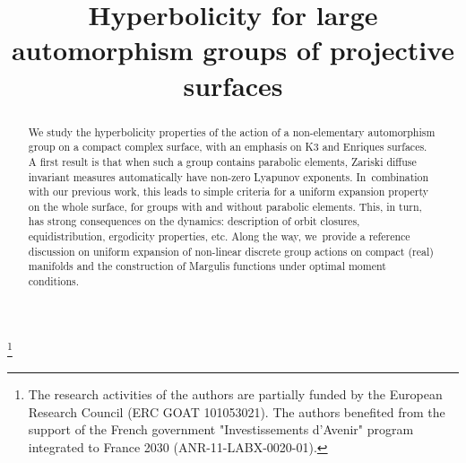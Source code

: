 \documentclass[JEP,XML,SOM,Unicode,published]{cedram}
\theoremstyle{plain}
\theoremstyle{definition}
\begin{document}
\frontmatter
\title[Hyperbolicity for automorphism groups of surfaces]
{Hyperbolicity for large automorphism groups of projective surfaces}

\author[\initial{S.} \lastname{Cantat}]{ }
\address{IRMAR, Campus de Beaulieu,\\
bât. 22-23, 263 avenue du Général Leclerc, CS 74205, 35042, Rennes Cedex}

\author[\initial{R.} \lastname{Dujardin}]{ }
\address{Sorbonne Université and Université Paris Cité, Laboratoire de Probabilités, Statistique et Modélisation (LPSM),\\
F-75005 Paris, France}

\thanks{The research activities of the authors are partially funded by the European Research Council (ERC GOAT 101053021). The authors benefited from the support of the French government "Investissements d'Avenir" program integrated to France 2030 (ANR-11-LABX-0020-01).}

\begin{abstract}
We study the hyperbolicity properties of the action of a non-elementary automorphism group on a compact complex surface, with an emphasis on K3 and Enriques surfaces. A first result is that when such a group contains parabolic elements, Zariski diffuse invariant measures automatically have non-zero Lyapunov exponents. In~combination with our previous work, this leads to simple criteria for a uniform expansion property on the whole surface, for groups with and without parabolic elements. This, in turn, has strong consequences on the dynamics: description of orbit closures, equidistribution, ergodicity properties, etc. Along the way, we~provide a reference discussion on uniform expansion of non-linear discrete group actions on compact (real) manifolds and the construction of Margulis functions under optimal moment conditions.
\end{abstract}



\end{document}
